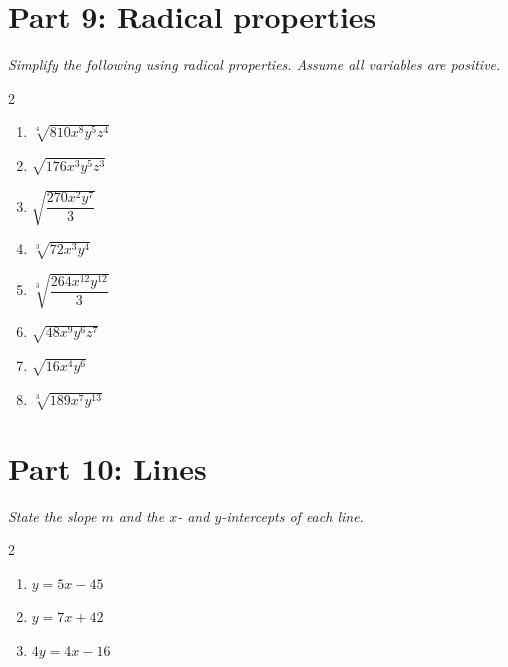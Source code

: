 \documentclass[11pt]{article}
\begin{document}
\section*{Part 9: Radical properties}
\noindent\textit{Simplify the following using radical properties. Assume all variables are positive.}
\begin{multicols}{2}
\begin{enumerate}
  \item $\sqrt[4]{810x^{8}y^{5}z^{4}}$
  \vspace{1.8cm}
  \item $\sqrt{176x^{3}y^{5}z^{3}}$
  \vspace{1.8cm}
  \item $\sqrt{\dfrac{270x^{2}y^{7}}{3}}$
  \vspace{1.8cm}
  \item $\sqrt[3]{72x^{3}y^{4}}$
  \vspace{1.8cm}
  \item $\sqrt[3]{\dfrac{264x^{12}y^{12}}{3}}$
  \vspace{1.8cm}
  \item $\sqrt{48x^{9}y^{6}z^{7}}$
  \vspace{1.8cm}
  \item $\sqrt{16x^{4}y^{6}}$
  \vspace{1.8cm}
  \item $\sqrt[3]{189x^{7}y^{13}}$
  \vspace{1.8cm}
\end{enumerate}
\end{multicols}

\section*{Part 10: Lines}
\noindent\textit{State the slope $m$ and the $x$- and $y$-intercepts of each line.}
\begin{multicols}{2}
\begin{enumerate}
  \item $y = 5x - 45$
  \vspace{1.8cm}
  \item $y = 7x + 42$
  \vspace{1.8cm}
  \item $4y = 4x - 16$
  \vspace{1.8cm}
\end{enumerate}
\end{multicols}
\end{document}
